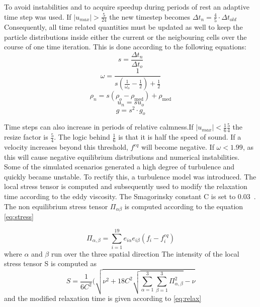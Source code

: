 \documentclass[10pt,a4paper,notitlepage]{article}
\begin{document}
To avoid instabilities and to acquire speedup during periods of rest an adaptive time step was used. If $|u_{max}|>\frac{5}{24}$ the new timestep becomes $\Delta t_{n}=\frac{4}{5} \cdot \Delta t_{old}$
Consequently, all time related quantities must be updated as well to keep the particle distributions inside either the current or the neigbouring cells over the course of one time iteration. This is done according to the following equations:
\begin{equation} \label{eq:dt}
s=\frac{\Delta t_{n}}{\Delta t_{o}}
\end{equation}
\begin{equation} \label{eq:omega}
\omega=\frac{1}{s(\frac{1}{\omega_{o}}-\frac{1}{2})+\frac{1}{2}}
\end{equation}
\begin{equation} \label{eq:density}
\rho_{n}=s(\rho_{o}-\rho_{\text{med}})+\rho_{\text{med}}
\end{equation}
\begin{equation} \label{eq:velocity}
u_{n}=su_{o}
\end{equation}
\begin{equation} \label{eq:gravity}
g=s^{2} \cdot g_{o}
\end{equation}

Time steps can also increase in periods of relative calmness.If $|u_{max}|<\frac{1}{6} \frac{5}{4}$ the resize factor is $\frac{5}{4}$. The logic behind $\frac{1}{6}$ is that it is half the speed of sound. If a velocity increases beyond this threshold, $f^{eq}$ will become negative.
If $\omega<1.99$, as this will cause negative equilibrium distributions and numerical instabilities. Some of the simulated scenarios generated a high degree of turbulence and quickly became unstable. To rectify this, a turbulence model was introduced. The local stress tensor is computed and subsequently used to modify the relaxation time according to the eddy viscosity. The Smagorinsky constant C is set to 0.03~\cite{thurey2007physically}. The non equilibrium stress tensor $\Pi_{\alpha\beta}$ is computed according to the equation \eqref{eq:stress}

\begin{equation} \label{eq:stress}
\Pi_{\alpha,\beta}=\sum^{19}_{i=1}e_{i\alpha}e_{i\beta}(f_{i}-f_{i}^{eq})
\end{equation}
where $\alpha$ and $\beta$ run over the three spatial direction
 The intensity of the local stress tensor S is computed as 
\begin{equation} \label{eq:intensity}
S=\frac{1}{6C^{2}}(\sqrt{\nu^{2}+18C^{2}\sqrt{\sum^{3}_{\alpha=1}\sum^{3}_{\beta=1}\Pi_{\alpha,\beta}^{2}}-\nu}
\end{equation}
and the modified relaxation time is given according to \eqref{eq:relax}
\end{document}
